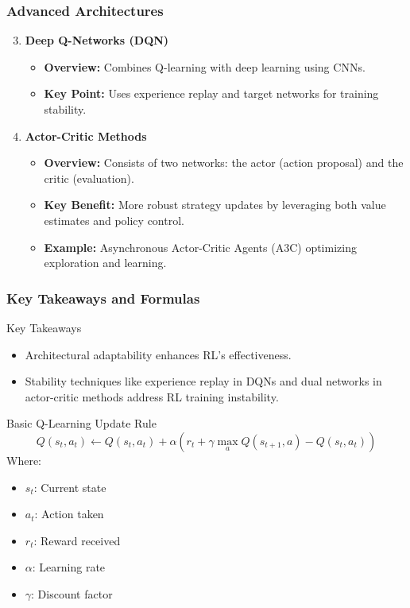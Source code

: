 \documentclass[aspectratio=169]{beamer}
\begin{document}
\begin{frame}[fragile]
    \frametitle{Advanced Architectures}
    \begin{enumerate}
        \setcounter{enumi}{2}
        \item \textbf{Deep Q-Networks (DQN)}
            \begin{itemize}
                \item \textbf{Overview:} Combines Q-learning with deep learning using CNNs.
                \item \textbf{Key Point:} Uses experience replay and target networks for training stability.
            \end{itemize}
        \item \textbf{Actor-Critic Methods}
            \begin{itemize}
                \item \textbf{Overview:} Consists of two networks: the actor (action proposal) and the critic (evaluation).
                \item \textbf{Key Benefit:} More robust strategy updates by leveraging both value estimates and policy control.
                \item \textbf{Example:} Asynchronous Actor-Critic Agents (A3C) optimizing exploration and learning.
            \end{itemize}
    \end{enumerate}
\end{frame}

\begin{frame}[fragile]
    \frametitle{Key Takeaways and Formulas}
    \begin{block}{Key Takeaways}
        \begin{itemize}
            \item Architectural adaptability enhances RL’s effectiveness.
            \item Stability techniques like experience replay in DQNs and dual networks in actor-critic methods address RL training instability.
        \end{itemize}
    \end{block}
    
    \begin{block}{Basic Q-Learning Update Rule}
        \begin{equation}
        Q(s_t, a_t) \leftarrow Q(s_t, a_t) + \alpha \left( r_t + \gamma \max_a Q(s_{t+1}, a) - Q(s_t, a_t) \right)
        \end{equation}
        Where:
        \begin{itemize}
            \item \( s_t \): Current state
            \item \( a_t \): Action taken
            \item \( r_t \): Reward received
            \item \( \alpha \): Learning rate
            \item \( \gamma \): Discount factor
        \end{itemize}
    \end{block}
\end{frame}
\end{document}
